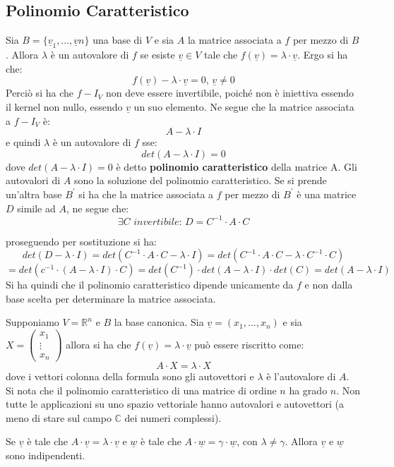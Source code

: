 \documentclass[a4paper,12pt, oneside]{book}
\begin{document}
\subsection{Polinomio Caratteristico}
\begin{definizione}
Sia $B=\{\underline{v}_1,...,\underline{v}n\}$ una base di $V$ e sia $A$ la matrice associata a $f$ per mezzo di $B$. Allora $\lambda$ è un autovalore di $f$ se esiste $\underline{v}\in V$ tale che $f(\underline{v})=\lambda\cdot \underline{v}$. Ergo si ha che: 
$$f(\underline{v})-\lambda\cdot \underline{v}=0,\, \underline{v}\neq 0$$ Perciò si ha che $f-I_V$ non deve essere invertibile, poiché non è iniettiva essendo il kernel non nullo, essendo $\underline{v}$ un suo elemento. Ne segue che la matrice associata a $f-I_V$ è:
$$A-\lambda\cdot I$$
e quindi $\lambda$ è un autovalore di $f$ sse: 
$$det(A-\lambda\cdot I)=0$$ 
dove $det(A-\lambda\cdot I)=0$ è detto \textbf{polinomio caratteristico} della matrice A. Gli autovalori di $A$ sono la soluzione del polinomio caratteristico. Se si prende un'altra base $B^{'}$ si ha che la matrice associata a $f$ per mezzo di $B^{'}$ è una matrice $D$ simile ad $A$, ne segue che:
$$\exists C \,\, invertibile :\, D=C^{-1}\cdot A\cdot C$$

proseguendo per sostituzione si ha:
$$det(D-\lambda\cdot I)=det(C^{-1}\cdot A\cdot C-\lambda\cdot I)=det(C^{-1}\cdot A\cdot C-\lambda\cdot C^{-1}\cdot C)$$
$$=det(c^{-1}\cdot (A-\lambda\cdot I)\cdot C)=det(C^{-1})\cdot det(A-\lambda\cdot I)\cdot det(C)=det(A-\lambda\cdot I)$$
Si ha quindi che il polinomio caratteristico dipende unicamente da $f$ e non dalla base scelta per determinare la matrice associata.
\end{definizione}
Supponiamo $V=\mathbb{R}^n$ e $B$ la base canonica. Sia $\underline{v}=(x_1,...,x_n)$ e sia $
X=\left(\begin{matrix}
x_1\\
\vdots\\
x_n
\end{matrix}\right)
$ allora si ha che $f(\underline{v})=\lambda\cdot \underline{v}$ può essere riscritto come:
$$A\cdot X=\lambda\cdot X$$
dove i vettori colonna della formula sono gli autovettori e $\lambda$ è l'autovalore di $A$.\\
Si nota che il polinomio caratteristico di una matrice di ordine $n$ ha grado $n$. Non tutte le applicazioni su uno spazio vettoriale hanno autovalori e autovettori (a meno di stare sul campo $\mathbb{C}$ dei numeri complessi).
\begin{teorema}
Se $\underline{v}$ è tale che $A\cdot \underline{v}=\lambda\cdot \underline{v}$ e $\underline{w}$ è tale che $A\cdot\underline{w}=\gamma\cdot\underline{w}$, con $\lambda\neq \gamma$. Allora $\underline{v}$ e $\underline{w}$ sono indipendenti.
\end{teorema}
\end{document}
